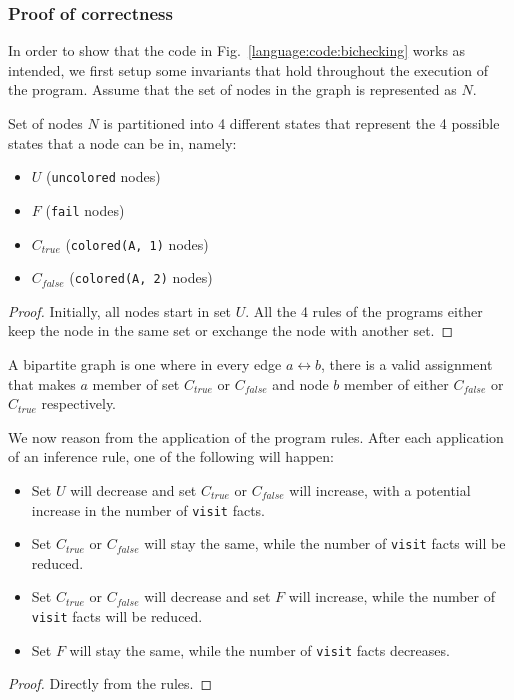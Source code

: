 \subsubsection{Proof of correctness}

In order to show that the code in Fig.~\ref{language:code:bichecking} works as
intended, we first setup some invariants that hold throughout the execution of
the program. Assume that the set of nodes in the graph is represented as $N$.

\begin{invariant}
Set of nodes $N$ is partitioned into 4 different states that represent the 4
possible states that a node can be in, namely:

\begin{itemize}
   \item $U$ (\texttt{uncolored} nodes)
   \item $F$ (\texttt{fail} nodes)
   \item $C_{true}$ (\texttt{colored(A, 1)} nodes)
   \item $C_{false}$ (\texttt{colored(A, 2)} nodes)
\end{itemize}
\end{invariant}
\begin{proof}
Initially, all nodes start in set $U$. All the 4 rules of the programs either
keep the node in the same set or exchange the node with another set.
\end{proof}

A bipartite graph is one where in every edge $a \leftrightarrow b$, there is a
valid assignment that makes $a$ member of set $C_{true}$ or $C_{false}$ and node
$b$ member of either $C_{false}$ or $C_{true}$ respectively.

\begin{lemma}\label{language:lemma:bipartite_convergence}
   We now reason from the application of the program rules. After each
   application of an inference rule, one of the following will happen:

   \begin{itemize}
      \item Set $U$ will decrease and set $C_{true}$ or $C_{false}$ will
         increase, with a potential increase in the number of \texttt{visit}
         facts.
      \item Set $C_{true}$ or $C_{false}$ will stay the same, while the number
         of \texttt{visit} facts will be reduced.

      \item Set $C_{true}$ or $C_{false}$ will decrease and set $F$ will
         increase, while the number of \texttt{visit} facts will be reduced.

      \item Set $F$ will stay the same, while the number of \texttt{visit} facts
         decreases.
   \end{itemize}

\end{lemma}
\begin{proof}
Directly from the rules.
\end{proof}

